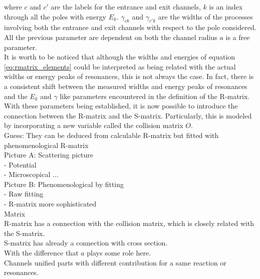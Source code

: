 \documentclass[openany]{book}
\begin{document}
where $c$ and $c'$ are the labels for the entrance and exit channels, $k$ is an index through all the poles with energy $E_k$. $\gamma_{ck}$ and $\gamma_{c'k}$ are the widths of the processes involving both the entrance and exit channels with respect to the pole considered. \\

All the previous parameter are dependent on both the channel radius  $a$ is a free parameter.  \\

It is worth to be noticed that although the widths and energies of equation \ref{eq:rmatrix_elements} could be interpreted as being related with the actual widths or energy peaks of resonances, this is not always the case. In fact, there is a consistent shift between the measured widths and energy peaks of resonances and the $E_k$ and $\gamma$ like parameters encountered in the definition of the R-matrix.  \\

With these parameters being established, it is now possible to introduce the connection between the R-matrix and the S-matrix. Particularly, this is modeled by incorporating a new variable called the collision matrix $O$. \\

Guess: They can be deduced from calculable R-matrix
but fitted with phenomenological R-matrix \\

Picture A: Scattering picture \\
	-	Potential \\
	-	Microscopical ... \\
	
Picture B: Phenomenological by fitting \\
	-	 Raw fitting \\
	-	R-matrix more sophisticated  \\

Matrix \\

R-matrix has a connection with the collision matrix, which is closely related with the S-matrix.  \\

S-matrix has already a connection with cross section. \\

With the difference that $a$ plays some role here.  \\

Channels unified parts with different contribution for a same reaction or resonances.  \\
\end{document}
